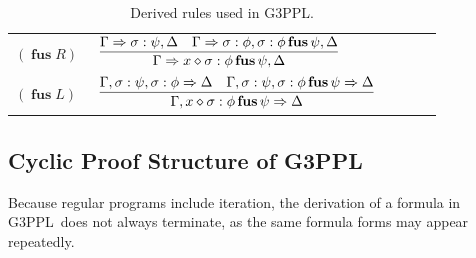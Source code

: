 \documentclass[manuscript,screen]{acmart}
\newcommand{\cat}[0]{\diamond}
\newcommand{\GiiiPPL}[0]{\mbox{G3PPL}}
\newcommand{\GiiiPPLcyc}[0]{\mbox{G3PPL}}
\DeclareMathOperator{\ofus}{\mathbf{fus}}
\begin{document}
\begin{table}[t]
\begin{tabular}{p{0.18\linewidth}p{0.74\linewidth}}
$(\ofus R)$ & $\begin{aligned}\infer[]{\Gamma\Rightarrow x\cat\sigma : \phi\ofus\psi, \Delta}{\Gamma\Rightarrow \sigma : \psi, \Delta & \Gamma\Rightarrow \sigma : \phi, \sigma : \phi\ofus \psi, \Delta}\end{aligned}$\\[1.2em]
$(\ofus L)$ & $\begin{aligned}\infer[]{\Gamma, x\cat\sigma : \phi\ofus\psi\Rightarrow \Delta}{\Gamma, \sigma : \psi, \sigma : \phi\Rightarrow \Delta & \Gamma, \sigma : \psi, \sigma : \phi\ofus \psi\Rightarrow \Delta}\end{aligned}$\\
\bottomrule
\end{tabular}
\caption{Derived rules used in \GiiiPPL.}
\label{table:giiippl-derived-propositional-rules}
\end{table}



\subsection{Cyclic Proof Structure of \GiiiPPLcyc}
\label{section:Cyclic Proof Structure of GiiiPPLcyc}

Because regular programs include iteration, the derivation of a formula in \GiiiPPL\ does not always terminate, as the same formula forms may appear repeatedly. 
\end{document}
